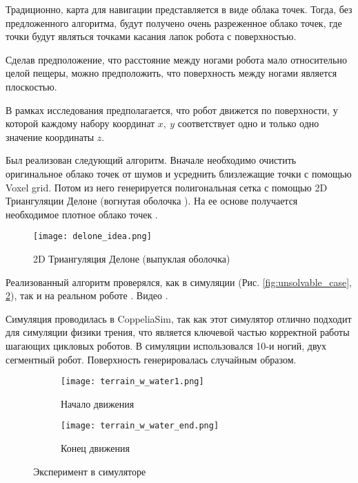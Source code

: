 Традиционно, карта для навигации представляется в виде облака точек. Тогда, без предложенного алгоритма, будут получено очень разреженное облако точек, где точки будут являться точками касания лапок робота с поверхностью.

Сделав предположение, что расстояние между ногами робота мало относительно целой пещеры, можно предположить, что поверхность между ногами является плоскостью.


В рамках исследования предполагается, что робот движется по поверхности, у которой каждому набору координат $x,\ y$ соответствует одно и только одно значение координаты $z$.

Был реализован следующий алгоритм. Вначале необходимо очистить оригинальное облако точек от шумов и усреднить близлежащие точки с помощью Voxel grid. Потом из него генерируется полигональная сетка с помощью 2D Триангуляции Делоне  (вогнутая оболочка ). На ее основе получается необходимое плотное облако точек .

\begin{figure}[H]
    \centering\texttt{[image: delone\_idea.png]}
    \caption{2D Триангуляция Делоне (выпуклая оболочка)}
    \label{fig:delone_idea.png}
\end{figure}

Реализованный алгоритм проверялся, как в симуляции (Рис. \ref{fig:unsolvable_case}, \ref{fig:start_end_exp}), так и на реальном роботе . Видео \quad {}.

Симуляция проводилась в CoppeliaSim, так как этот симулятор отлично подходит для симуляции физики трения, что является ключевой частью корректной работы шагающих цикловых роботов. В симуляции использовался 10-и ногий, двух сегментный робот. Поверхность генерировалась случайным образом.


\begin{figure}[H]
    \begin{subfigure}[t]{0.49\textwidth}
        \centering\texttt{[image: terrain\_w\_water1.png]}
        \caption{Начало движения}
    \end{subfigure}
    \begin{subfigure}[t]{0.49\textwidth}
        \centering\texttt{[image: terrain\_w\_water\_end.png]}
        \caption{Конец движения}
    \end{subfigure}
    \caption{Эксперимент в симуляторе}
    \label{fig:start_end_exp}
\end{figure}


